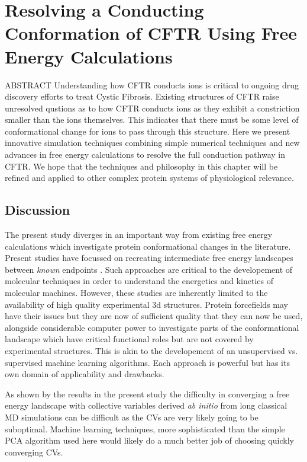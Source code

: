\chapter{Resolving a Conducting Conformation of CFTR Using Free Energy Calculations}
\label{chap:opening}
\chapquote{} {}
ABSTRACT 
Understanding how CFTR conducts ions is critical to ongoing drug discovery efforts to treat Cystic Fibrosis. Existing structures of CFTR  raise unresolved qustions as to how CFTR conducts ions as they exhibit a constriction smaller than the ions themselves. This indicates that there must be some level of conformational change for ions to pass through this structure. Here we present innovative simulation techniques combining simple numerical techniques and new advances in free energy calculations to resolve the full conduction pathway in CFTR. We hope that the techniques and philosophy in this chapter will be refined and applied to other complex protein systems of physiological relevance. 
\newline

\section{Discussion}

The present study diverges in an important way from existing free energy calculations which investigate protein conformational changes in the literature. Present studies have focussed on recreating intermediate free energy landscapes between \textit{known} endpoints \cite{lev2020, bergh2021}. Such approaches are critical to the developement of molecular techniques in order to understand the energetics and kinetics of molecular machines. However, these studies are inherently limited to the availability of high quality experimental 3d structures. Protein forcefields may have their issues but they are now of sufficient quality that they can now be used, alongside considerable computer power to investigate parts of the conformational landscape which have critical functional roles but are not covered by experimental structures. This is akin to the developement of an unsupervised vs. supervised machine learning algorithms. Each approach is powerful but has its own domain of applicability and drawbacks. 

As shown by the results in the present study the difficulty in converging a free energy landscape with collective variables derived \textit {ab initio} from long classical MD simulations can be difficult as the CVs are very likely going to be suboptimal. Machine learning techniques, more sophisticated than the simple PCA algorithm used here would likely do a much better job of choosing quickly converging CVs. 
